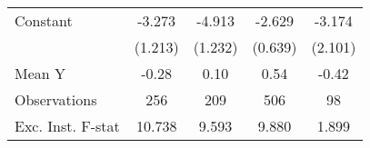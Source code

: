 {\begin{tabular}{l*{4}{c}}
\addlinespace
Constant            &      -3.273\sym{**} &      -4.913\sym{***}&      -2.629\sym{***}&      -3.174         \\
                    &     (1.213)         &     (1.232)         &     (0.639)         &     (2.101)         \\
\midrule
Mean Y              &       -0.28         &        0.10         &        0.54         &       -0.42         \\
Observations        &         256         &         209         &         506         &          98         \\
Exc. Inst. F-stat   &      10.738         &       9.593         &       9.880         &       1.899         \\
\bottomrule
\end{tabular}
}
